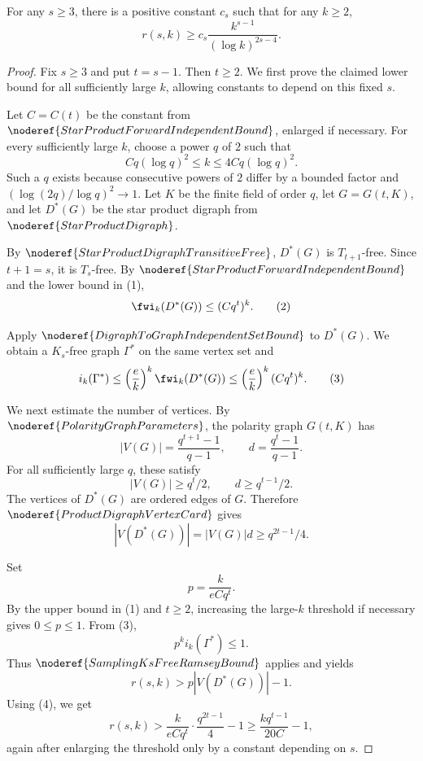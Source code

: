 \begin{theorem}
For any \(s\ge 3\), there is a positive constant \(c_s\) such that for any
\(k\ge 2\),
\[
  r(s,k)\ge c_s\frac{k^{s-1}}{(\log k)^{2s-4}}.
\]
\end{theorem}
\begin{proof}
Fix \(s\ge3\) and put \(t=s-1\).  Then \(t\ge2\).  We first prove the
claimed lower bound for all sufficiently large \(k\), allowing constants to
depend on this fixed \(s\).

Let \(C=C(t)\) be the constant from
\(\noderef{StarProductForwardIndependentBound}\), enlarged if necessary.
For every sufficiently large \(k\), choose a power \(q\) of \(2\) such that
\[
  Cq(\log q)^2\le k\le 4Cq(\log q)^2. \tag{1}
\]
Such a \(q\) exists because consecutive powers of \(2\) differ by a bounded
factor and \((\log(2q)/\log q)^2\to1\).  Let \(K\) be the finite field of
order \(q\), let \(G=G(t,K)\), and let \(D^*(G)\) be the star product digraph
from \(\noderef{StarProductDigraph}\).

By \(\noderef{StarProductDigraphTransitiveFree}\), \(D^*(G)\) is
\(T_{t+1}\)-free.  Since \(t+1=s\), it is \(T_s\)-free.  By
\(\noderef{StarProductForwardIndependentBound}\) and the lower bound in (1),
\[
  \fwi_k(D^*(G))\le (Cq^t)^k. \tag{2}
\]

Apply \(\noderef{DigraphToGraphIndependentSetBound}\) to \(D^*(G)\).  We
obtain a \(K_s\)-free graph \(\Gamma^*\) on the same vertex set and
\[
  i_k(\Gamma^*)
  \le
  \left(\frac e k\right)^k \fwi_k(D^*(G))
  \le
  \left(\frac e k\right)^k(Cq^t)^k. \tag{3}
\]

We next estimate the number of vertices.  By
\(\noderef{PolarityGraphParameters}\), the polarity graph \(G(t,K)\) has
\[
  |V(G)|=\frac{q^{t+1}-1}{q-1},\qquad
  d=\frac{q^t-1}{q-1}.
\]
For all sufficiently large \(q\), these satisfy
\[
  |V(G)|\ge q^t/2,\qquad d\ge q^{t-1}/2.
\]
The vertices of \(D^*(G)\) are ordered edges of \(G\).  Therefore
\(\noderef{ProductDigraphVertexCard}\) gives
\[
  |V(D^*(G))|=|V(G)|d\ge q^{2t-1}/4. \tag{4}
\]

Set
\[
  p=\frac{k}{eCq^t}.
\]
By the upper bound in (1) and \(t\ge2\), increasing the large-\(k\) threshold
if necessary gives \(0\le p\le1\).  From (3),
\[
  p^k i_k(\Gamma^*)\le1.
\]
Thus \(\noderef{SamplingKsFreeRamseyBound}\) applies and yields
\[
  r(s,k)> p|V(D^*(G))|-1.
\]
Using (4), we get
\[
  r(s,k)
  >
  \frac{k}{eCq^t}\cdot\frac{q^{2t-1}}4-1
  \ge
  \frac{kq^{t-1}}{20C}-1, \tag{5}
\]
again after enlarging the threshold only by a constant depending on \(s\).


\end{proof}
